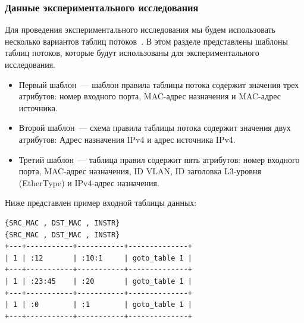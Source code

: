 \documentclass[oneside,final,12pt]{extarticle}
\begin{document}
            \subsubsection{Данные экспериментального исследования}
                Для проведения экспериментального исследования мы будем использовать несколько вариантов таблиц потоков~\cite{braun2014wildcard}. 
                В этом разделе представлены шаблоны таблиц потоков, которые будут использованы для экспериментального исследования.
                \begin{itemize}
                    \item Первый шаблон~--- шаблон правила таблицы потока содержит значения трех атрибутов: номер входного порта, MAC-адрес назначения и MAC-адрес источника.
                    \item Второй шаблон~--- схема правила таблицы потока содержит значения двух атрибутов: Адрес назначения IPv4 и адрес источника IPv4.
                    \item Третий шаблон~--- таблица правил содержит пять атрибутов: номер входного порта, MAC-адрес назначения, ID VLAN, ID заголовка L3-уровня (EtherType) и IPv4-адрес назначения.
                \end{itemize}
                Ниже представлен пример входной таблицы данных:
\lstset{numbers=none}
\begin{lstlisting}
{SRC_MAC , DST_MAC , INSTR}
{SRC_MAC , DST_MAC , INSTR}
+---+-----------+-----------+--------------+
| 1 | :12       | :10:1     | goto_table 1 |
+---+-----------+-----------+--------------+
| 1 | :23:45    | :20       | goto_table 1 |
+---+-----------+-----------+--------------+
| 1 | :0        | :1        | goto_table 1 |
+---+-----------+-----------+--------------+
\end{lstlisting}
\lstset{numbers=left}
                
\end{document}
